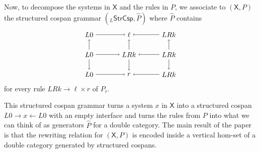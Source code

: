 \documentclass{amsart}
\renewcommand{\hat}[1]{\widehat{#1}}
\newcommand{\X}{\cat{X}}
\newcommand{\StrCsp}{\cat{StrCsp}}
\newcommand{\cat}[1]{\mathsf{#1}}
\renewcommand{\gets}{\leftarrow}
\theoremstyle{remark}
\theoremstyle{definition}
\begin{document}
Now, to decompose the systems in $ \X $ and the rules in
$ P $, we associate to $ ( \X , P ) $ the structured cospan
grammar $ ( _{L}\StrCsp , \hat{P} ) $ where $ \hat{P} $
contains
%
\[
  \begin{tikzpicture}
    \node (1) at (0,2) {$ L 0 $};
    \node (2) at (2,2) {$ \ell $};
    \node (3) at (4,2) {$ LRk $};
    \node (4) at (0,1) {$ L 0 $};
    \node (5) at (2,1) {$ LRk $};
    \node (6) at (4,1) {$ LRk $};
    \node (7) at (0,0) {$ L 0 $};
    \node (8) at (2,0) {$ r $};
    \node (9) at (4,0) {$ LRk $};
    \draw [->] (1) to node [] {\scriptsize{$  $}} (2);
    \draw [->] (3) to node [] {\scriptsize{$  $}} (2);
    \draw [->] (4) to node [] {\scriptsize{$  $}} (5);
    \draw [->] (6) to node [] {\scriptsize{$  $}} (5);
    \draw [->] (7) to node [] {\scriptsize{$  $}} (8);
    \draw [->] (9) to node [] {\scriptsize{$  $}} (8);
    \draw [->] (4) to node [] {\scriptsize{$  $}} (1);
    \draw [->] (4) to node [] {\scriptsize{$  $}} (7);
    \draw [->] (5) to node [] {\scriptsize{$  $}} (2);
    \draw [->] (5) to node [] {\scriptsize{$  $}} (8);
    \draw [->] (6) to node [] {\scriptsize{$  $}} (3);
    \draw [->] (6) to node [] {\scriptsize{$  $}} (9);
  \end{tikzpicture}
\]
% 
for every rule $ LRk \to \ell \times r $ of $ P_{\flat} $.

This structured cospan grammar turns a system
$ x $ in $ \X $ into a structured cospan
$ L0 \to x \gets L0 $ with an empty interface and turns
the rules from $ P $ into what we can think of as generators
$ \hat{P} $ for a double category.  The main result of the
paper is that the rewriting relation for $ ( \X,P ) $ is
encoded inside a vertical hom-set of a double category
generated by structured cospans.
\end{document}
